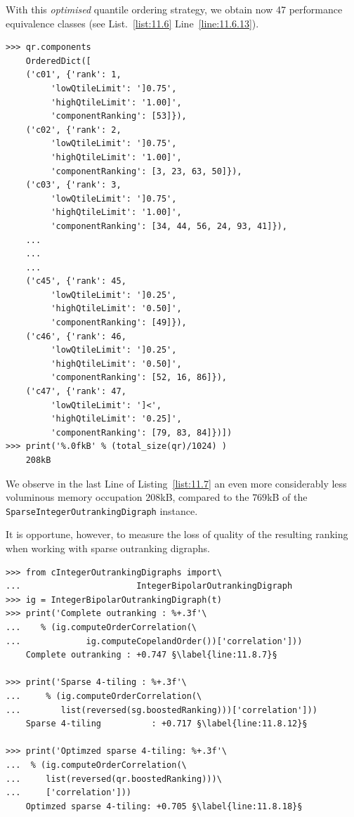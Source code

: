With this \emph{optimised} quantile ordering strategy, we obtain now 47 performance equivalence classes (see List.~\vref{list:11.6} Line~\ref{line:11.6.13}).
\begin{lstlisting}[caption={The ordered components of the sparse outranking digraph},label=list:11.7]
>>> qr.components
    OrderedDict([
    ('c01', {'rank': 1,
	     'lowQtileLimit': ']0.75',
	     'highQtileLimit': '1.00]',
	     'componentRanking': [53]}),
    ('c02', {'rank': 2,
	     'lowQtileLimit': ']0.75',
	     'highQtileLimit': '1.00]',
	     'componentRanking': [3, 23, 63, 50]}),
    ('c03', {'rank': 3,
	     'lowQtileLimit': ']0.75',
	     'highQtileLimit': '1.00]',
	     'componentRanking': [34, 44, 56, 24, 93, 41]}), 
    ...
    ...
    ...
    ('c45', {'rank': 45,
	     'lowQtileLimit': ']0.25',
	     'highQtileLimit': '0.50]',
	     'componentRanking': [49]}),
    ('c46', {'rank': 46,
	     'lowQtileLimit': ']0.25',
	     'highQtileLimit': '0.50]',
	     'componentRanking': [52, 16, 86]}),
    ('c47', {'rank': 47,
	     'lowQtileLimit': ']<',
	     'highQtileLimit': '0.25]',
	     'componentRanking': [79, 83, 84]})])
>>> print('%.0fkB' % (total_size(qr)/1024) )
    208kB
\end{lstlisting}

We observe in the last Line of Listing~\vref{list:11.7} an even more considerably less voluminous memory occupation $208$kB, compared to the $769$kB of the \texttt{SparseInte\-gerOutran\-king\-Digraph} instance.

It is opportune, however, to measure the loss of quality of the resulting \Copeland ranking when working with sparse outranking digraphs.
\begin{lstlisting}[caption={Measuring the loss of quality with respect to the standard outranking digraph},label=list:11.8]
>>> from cIntegerOutrankingDigraphs import\
...                       IntegerBipolarOutrankingDigraph
>>> ig = IntegerBipolarOutrankingDigraph(t)
>>> print('Complete outranking : %+.3f'\
...    % (ig.computeOrderCorrelation(\
...             ig.computeCopelandOrder())['correlation']))
    Complete outranking : +0.747 §\label{line:11.8.7}§

>>> print('Sparse 4-tiling : %+.3f'\
...     % (ig.computeOrderCorrelation(\
...        list(reversed(sg.boostedRanking)))['correlation']))   
    Sparse 4-tiling          : +0.717 §\label{line:11.8.12}§

>>> print('Optimzed sparse 4-tiling: %+.3f'\
...  % (ig.computeOrderCorrelation(\
...     list(reversed(qr.boostedRanking)))\
...     ['correlation']))  
    Optimzed sparse 4-tiling: +0.705 §\label{line:11.8.18}§
\end{lstlisting}

